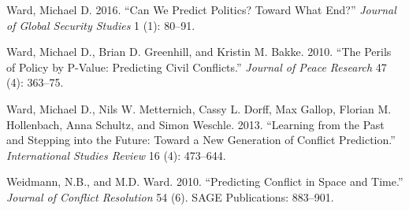 \documentclass[]{article}
\begin{document}
\leavevmode\hypertarget{ref-ward:2016}{}%
Ward, Michael D. 2016. ``Can We Predict Politics? Toward What End?''
\emph{Journal of Global Security Studies} 1 (1): 80--91.

\leavevmode\hypertarget{ref-ward:etal:2010}{}%
Ward, Michael D., Brian D. Greenhill, and Kristin M. Bakke. 2010. ``The
Perils of Policy by P-Value: Predicting Civil Conflicts.'' \emph{Journal
of Peace Research} 47 (4): 363--75.

\leavevmode\hypertarget{ref-ward:etal:2013}{}%
Ward, Michael D., Nils W. Metternich, Cassy L. Dorff, Max Gallop,
Florian M. Hollenbach, Anna Schultz, and Simon Weschle. 2013. ``Learning
from the Past and Stepping into the Future: Toward a New Generation of
Conflict Prediction.'' \emph{International Studies Review} 16 (4):
473--644.

\leavevmode\hypertarget{ref-weidmann:ward:2010}{}%
Weidmann, N.B., and M.D. Ward. 2010. ``Predicting Conflict in Space and
Time.'' \emph{Journal of Conflict Resolution} 54 (6). SAGE Publications:
883--901.
\end{document}
